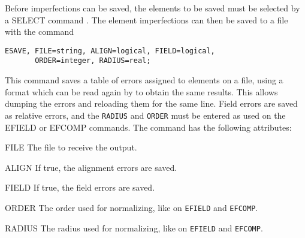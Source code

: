 Before imperfections can be saved,
the elements to be saved must be selected by a
{SELECT} command .
The element imperfections can then be saved to a file with the command
\begin{verbatim}
ESAVE, FILE=string, ALIGN=logical, FIELD=logical,
       ORDER=integer, RADIUS=real;
\end{verbatim}
This command saves a table of errors assigned to elements on a file,
using a format which can be read again by \opal to obtain the same results.
This allows dumping the errors and reloading them for the same line.
Field errors are saved as relative errors,
and the \texttt{RADIUS} and \texttt{ORDER} must be entered as used on the
{EFIELD}  or
{EFCOMP}  commands.
The command has the following attributes:
\begin{kdescription}
\item[FILE]
  The file to receive the output.
\item[ALIGN]
  If true, the alignment errors are saved.
\item[FIELD]
  If true, the field errors are saved.
\item[ORDER]
  The order used for normalizing, like on \texttt{EFIELD} and
  \texttt{EFCOMP}.
\item[RADIUS]
  The radius used for normalizing, like on \texttt{EFIELD} and
  \texttt{EFCOMP}.
\end{kdescription}


